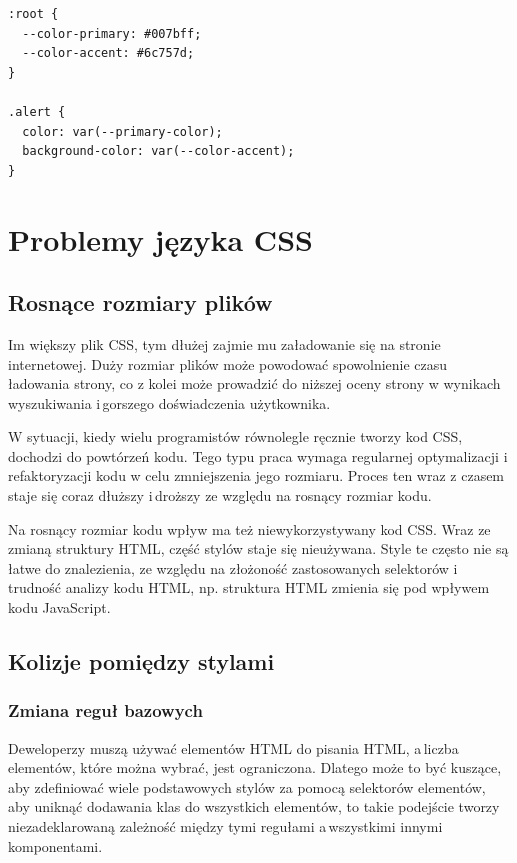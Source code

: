 \documentclass[a4paper,12pt]{book} %
\begin{document}
\begin{lstfloat}[hb]
  \lstset{language=HTML}
  \begin{lstlisting}[frame=single]
:root {
  --color-primary: #007bff;
  --color-accent: #6c757d;
}

.alert {
  color: var(--primary-color);
  background-color: var(--color-accent);
}
\end{lstlisting}
  \caption{Przykład użycia zmiennych CSS}\label{variables_css}
\end{lstfloat}

\chapter{Problemy języka CSS}
\section{Rosnące rozmiary plików}
Im większy plik CSS, tym dłużej zajmie mu załadowanie się na stronie internetowej. Duży rozmiar plików może powodować spowolnienie czasu ładowania strony, co z kolei może prowadzić do niższej oceny strony w wynikach wyszukiwania i\,gorszego doświadczenia użytkownika.

W sytuacji, kiedy wielu programistów równolegle ręcznie tworzy kod CSS, dochodzi do powtórzeń kodu. Tego typu praca wymaga regularnej optymalizacji i\,refaktoryzacji kodu w celu zmniejszenia jego rozmiaru. Proces ten wraz z czasem staje się coraz dłuższy i\,droższy ze względu na rosnący rozmiar kodu.

Na rosnący rozmiar kodu wpływ ma też niewykorzystywany kod CSS. Wraz ze zmianą struktury HTML, część stylów staje się nieużywana. Style te często nie są łatwe do znalezienia, ze względu na złożoność zastosowanych selektorów i\,trudność analizy kodu HTML, np. struktura HTML zmienia się pod wpływem kodu JavaScript.
\section{Kolizje pomiędzy stylami}
\subsection{Zmiana reguł bazowych}

Deweloperzy muszą używać elementów HTML do pisania HTML, a\,liczba elementów, które można wybrać, jest ograniczona. Dlatego może to być kuszące, aby zdefiniować wiele podstawowych stylów za pomocą selektorów elementów, aby uniknąć dodawania klas do wszystkich elementów, to takie podejście tworzy niezadeklarowaną zależność między tymi regułami a\,wszystkimi innymi komponentami.
\end{document}
